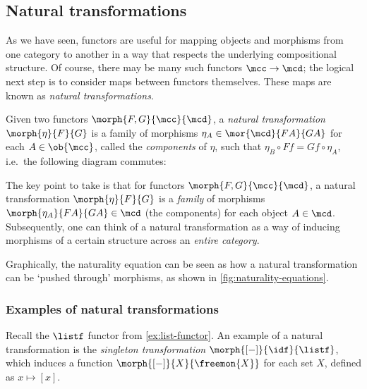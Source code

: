 \subsection{Natural transformations}

As we have seen, functors are useful for mapping objects and morphisms from one
category to another in a way that respects the underlying compositional
structure.
Of course, there may be many such functors \(\mcc \to \mcd\); the logical next
step is to consider maps between functors themselves.
These maps are known as \emph{natural transformations}.

\begin{definition}
    Given two functors \(\morph{F, G}{\mcc}{\mcd}\), a
    \emph{natural transformation} \(\morph{\eta}{F}{G}\) is a family of
    morphisms \(
        \eta_A \in \mor{\mcd}{FA}{GA}
    \) for each \(A \in \ob{\mcc}\), called the \emph{components} of \(\eta\),
    such that \(
        \eta_B \circ Ff = Gf \circ \eta_A
    \), i.e.\ the following diagram commutes:
    \begin{center}
        
    \end{center}
\end{definition}

The key point to take is that for functors \(\morph{F,G}{\mcc}{\mcd}\), a
natural transformation \(\morph{\eta}{F}{G}\) is a \emph{family} of morphisms
\(\morph{\eta_A}{FA}{GA} \in \mcd\) (the components) for each object
\(A \in \mcd\).
Subsequently, one can think of a natural transformation as a way of inducing
morphisms of a certain structure across an \emph{entire category}.

Graphically, the naturality equation can be seen as how a natural transformation
can be `pushed through' morphisms, as shown in \cref{fig:naturality-equations}.



\subsubsection{Examples of natural transformations}

\begin{example}[Singleton]
    Recall the \(\listf\) functor from \cref{ex:list-functor}.
    An example of a natural transformation is the
    \emph{singleton transformation} \(\morph{[-]}{\idf}{\listf}\), which
    induces a function \(\morph{[-]}{X}{\freemon{X}}\) for each set \(X\),
    defined as \(x \mapsto [x]\).
\end{example}


